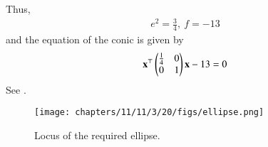    Thus,
    \begin{align}
        e^2 = \frac{3}{4},\ f = -13
    \end{align}
    and the equation of the conic is given by
    \begin{align}
        \mathbf{x}^\top\begin{pmatrix}\frac{1}{4}&0\\0&1\end{pmatrix}\mathbf{x} - 13 = 0
    \end{align}
    See .
    \begin{figure}[H]
        \centering
        \texttt{[image: chapters/11/11/3/20/figs/ellipse.png]}
        \caption{Locus of the required ellipse.}
        \label{fig:chapters/11/11/3/20/ellipse}
    \end{figure}
